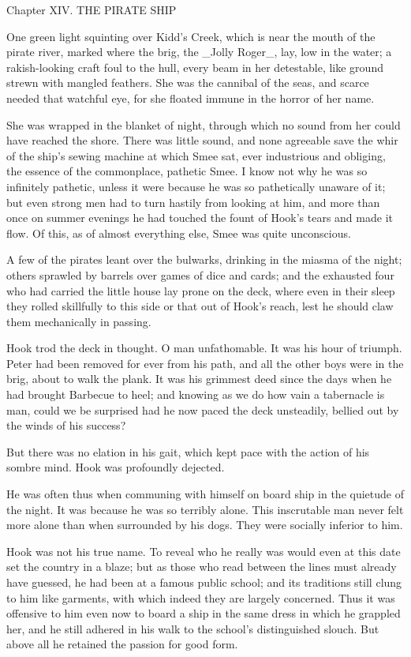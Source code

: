 Chapter XIV.
THE PIRATE SHIP


One green light squinting over Kidd's Creek, which is near the mouth of
the pirate river, marked where the brig, the _Jolly Roger_, lay, low in
the water; a rakish-looking craft foul to the hull, every beam in her
detestable, like ground strewn with mangled feathers. She was the
cannibal of the seas, and scarce needed that watchful eye, for she
floated immune in the horror of her name.

She was wrapped in the blanket of night, through which no sound from
her could have reached the shore. There was little sound, and none
agreeable save the whir of the ship's sewing machine at which Smee sat,
ever industrious and obliging, the essence of the commonplace, pathetic
Smee. I know not why he was so infinitely pathetic, unless it were
because he was so pathetically unaware of it; but even strong men had
to turn hastily from looking at him, and more than once on summer
evenings he had touched the fount of Hook's tears and made it flow. Of
this, as of almost everything else, Smee was quite unconscious.

A few of the pirates leant over the bulwarks, drinking in the miasma of
the night; others sprawled by barrels over games of dice and cards; and
the exhausted four who had carried the little house lay prone on the
deck, where even in their sleep they rolled skillfully to this side or
that out of Hook's reach, lest he should claw them mechanically in
passing.

Hook trod the deck in thought. O man unfathomable. It was his hour of
triumph. Peter had been removed for ever from his path, and all the
other boys were in the brig, about to walk the plank. It was his
grimmest deed since the days when he had brought Barbecue to heel; and
knowing as we do how vain a tabernacle is man, could we be surprised
had he now paced the deck unsteadily, bellied out by the winds of his
success?

But there was no elation in his gait, which kept pace with the action
of his sombre mind. Hook was profoundly dejected.

He was often thus when communing with himself on board ship in the
quietude of the night. It was because he was so terribly alone. This
inscrutable man never felt more alone than when surrounded by his dogs.
They were socially inferior to him.

Hook was not his true name. To reveal who he really was would even at
this date set the country in a blaze; but as those who read between the
lines must already have guessed, he had been at a famous public school;
and its traditions still clung to him like garments, with which indeed
they are largely concerned. Thus it was offensive to him even now to
board a ship in the same dress in which he grappled her, and he still
adhered in his walk to the school's distinguished slouch. But above all
he retained the passion for good form.

